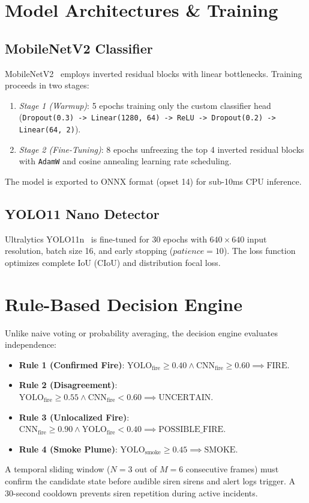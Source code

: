 \documentclass[conference]{IEEEtran}
\begin{document}
\section{Model Architectures \& Training}

\subsection{MobileNetV2 Classifier}
MobileNetV2~\cite{sandler2018mobilenetv2} employs inverted residual blocks with linear bottlenecks. Training proceeds in two stages:
\begin{enumerate}
    \item \textit{Stage 1 (Warmup)}: 5 epochs training only the custom classifier head (\texttt{Dropout(0.3) -> Linear(1280, 64) -> ReLU -> Dropout(0.2) -> Linear(64, 2)}).
    \item \textit{Stage 2 (Fine-Tuning)}: 8 epochs unfreezing the top 4 inverted residual blocks with \texttt{AdamW} and cosine annealing learning rate scheduling.
\end{enumerate}
The model is exported to ONNX format (opset 14) for sub-10ms CPU inference.

\subsection{YOLO11 Nano Detector}
Ultralytics YOLO11n~\cite{ultralytics_yolo11} is fine-tuned for 30 epochs with $640 \times 640$ input resolution, batch size 16, and early stopping ($patience=10$). The loss function optimizes complete IoU (CIoU) and distribution focal loss.

\section{Rule-Based Decision Engine}
Unlike naive voting or probability averaging, the decision engine evaluates independence:
\begin{itemize}
    \item \textbf{Rule 1 (Confirmed Fire)}: $\text{YOLO}_{\text{fire}} \ge 0.40 \land \text{CNN}_{\text{fire}} \ge 0.60 \implies \text{FIRE}$.
    \item \textbf{Rule 2 (Disagreement)}: $\text{YOLO}_{\text{fire}} \ge 0.55 \land \text{CNN}_{\text{fire}} < 0.60 \implies \text{UNCERTAIN}$.
    \item \textbf{Rule 3 (Unlocalized Fire)}: $\text{CNN}_{\text{fire}} \ge 0.90 \land \text{YOLO}_{\text{fire}} < 0.40 \implies \text{POSSIBLE\_FIRE}$.
    \item \textbf{Rule 4 (Smoke Plume)}: $\text{YOLO}_{\text{smoke}} \ge 0.45 \implies \text{SMOKE}$.
\end{itemize}
A temporal sliding window ($N=3$ out of $M=6$ consecutive frames) must confirm the candidate state before audible siren sirens and alert logs trigger. A 30-second cooldown prevents siren repetition during active incidents.
\end{document}
